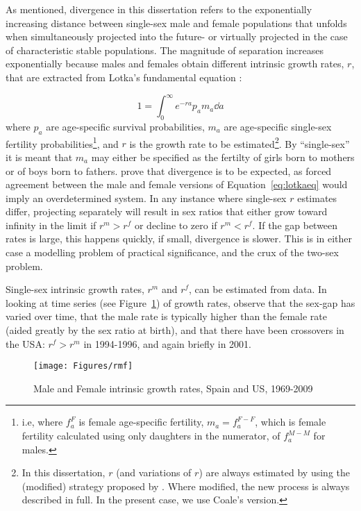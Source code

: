  \FloatBarrier
 \label{sex:divlotkar}
As mentioned, divergence in this dissertation refers to the exponentially
increasing distance between single-sex male and female populations that unfolds
when simultaneously projected into the future- or virtually projected in the
case of characteristic stable populations. The magnitude of separation increases
exponentially because males and females obtain different intrinsic 
growth rates, $r$, that are extracted from Lotka's fundamental equation
\citep{sharpe1911problem}:

\begin{equation}
\label{eq:lotkaeq}
1 = \int _0 ^\infty e^{-ra}p_a m_a \dd a 
\end{equation}
where $p_a$ are age-specific survival probabilities, $m_a$ are age-specific
single-sex fertility probabilities\footnote{i.e, where $f_a^F$ is female
age-specific fertility,  $m_a = f_a^{F-F}$, which is female fertility calculated
using only daughters in the numerator, of $f_a^{M-M}$ for males.}, and $r$ is
the growth rate to be estimated\footnote{In this dissertation, $r$ (and variations of $r$) are always estimated by using the (modified) strategy proposed by \citet{coale1957new}. Where modified, the new process is always described in full. In the present
case, we use Coale's version.}. By ``single-sex'' it is meant that $m_a$ may
either be specified as the fertilty of girls born to mothers or of boys born to fathers. \citet{yellin1977comparison} prove that divergence is to be expected, as forced agreement between the male and female versions of Equation~\eqref{eq:lotkaeq} would imply an overdetermined system. 
In any instance
where single-sex $r$ estimates differ, projecting separately will result in sex
ratios that either grow toward infinity in the limit if $r^m
> r^f$ or decline to zero if $r^m < r^f$. If the gap between rates is large, this happens
quickly, if small, divergence is slower. This is in either case a modelling
problem of practical significance, and the crux of the two-sex problem. 

Single-sex intrinsic growth rates, $r^m$ and $r^f$, can be 
estimated from data. In looking at time series (see Figure~\ref{fig:rmf}) of 
 growth rates, observe that the sex-gap has varied over 
time, that the male rate is typically higher than the female rate (aided greatly 
by the sex ratio at birth), and that there have been crossovers in the USA: 
$r^f > r^m$ in 1994-1996, and again briefly in 2001. 

\begin{figure}[ht!]
        \centering  
          \caption{Male and Female intrinsic growth rates, Spain and US,
          1969-2009}
           \texttt{[image: Figures/rmf]}
          \label{fig:rmf}
\end{figure}

